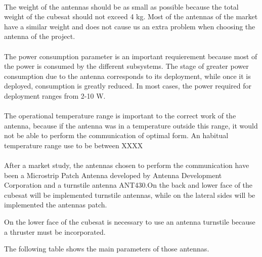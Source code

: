 \paragraph{} 
The weight of the antennas should be as small as possible because the total weight of the cubesat should not exceed 4 kg. Most of the antennas of the market have a similar weight and does not cause us an extra problem when choosing the antenna of the project.

\paragraph{} 
The power consumption parameter is an important requierement because most of the power is consumed by the different subsystems. The stage of greater power consumption due to the antenna corresponds to its deployment, while once it is deployed, consumption is greatly reduced. In most cases, the power required for deployment ranges from 2-10 W. 

\paragraph{}
The operational temperature range is important to the correct work of the antenna, because if the antenna was in a temperature outside this range, it would not be able to perform the communication of optimal form. An habitual temperature range use to be between XXXX

\paragraph{}
After a market study, the antennas chosen to perform the communication have been a Microstrip Patch Antenna developed by Antenna Development Corporation and a turnstile antenna ANT430.On the back and lower face of the cubesat will be implemented turnstile antennas, while on the lateral sides will be implemented the antennas patch. 

On the lower face of the cubesat is necessary to use an antenna turnstile because a thruster must be incorporated. 

The following table shows the main parameters of those antennas.


